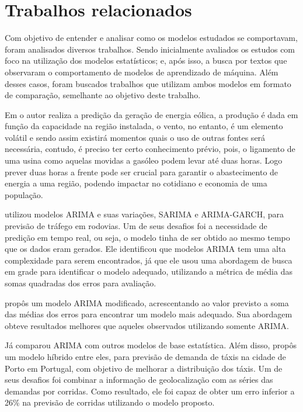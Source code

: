 \documentclass[
    12pt,
    oneside,
    a4paper,
    english,
    brazil
]{abntex2}
\begin{document}
\chapter{Trabalhos relacionados}\label{chap:trab_relacionados}

Com objetivo de  entender e analisar como os modelos  estudados se comportavam,
foram analisados  diversos trabalhos.  Sendo inicialmente avaliados  os estudos
com foco  na utilização  dos modelos  estatísticos; e, após  isso, a  busca por
textos que  observaram o  comportamento de modelos  de aprendizado  de máquina.
Além  desses casos,  foram buscados  trabalhos  que utilizam  ambos modelos  em
formato de comparação, semelhante ao objetivo deste trabalho.


Em    o autor  realiza  a  predição da  geração  de
energia eólica, a produção é dada  em função da capacidade na região instalada,
o vento,  no entanto,  é um  elemento volátil e  sendo assim  existirá momentos
quais o  uso de  outras fontes  será necessária, contudo,  é preciso  ter certo
conhecimento prévio,  pois, o  ligamento de  uma usina  como aquelas  movidas a
gasóleo podem levar  até duas horas. Logo  prever duas horas a  frente pode ser
crucial para garantir o abastecimento de energia a uma região, podendo impactar
no cotidiano e economia de uma população.

  utilizou   modelos  ARIMA   e  suas  variações,   SARIMA  e
ARIMA-GARCH, para  previsão de tráfego em  rodovias. Um de seus  desafios foi a
necessidade de predição em tempo real, ou seja, o modelo tinha de ser obtido ao
mesmo tempo  que os dados eram  gerados. Ele identificou que  modelos ARIMA tem
uma alta complexidade para serem encontrados,  já que ele usou uma abordagem de
busca em  grade para  identificar o  modelo adequado,  utilizando a  métrica de
média das somas quadradas dos erros para avaliação.

  propôs um  modelo  ARIMA modificado, acrescentando ao  valor
previsto a  soma das médias dos  erros para encontrar um  modelo mais adequado.
Sua  abordagem obteve  resultados  melhores que  aqueles observados  utilizando
somente ARIMA\@.

Já  comparou  ARIMA com outros modelos  de base estatística.
Além disso,  propôs um modelo híbrido  entre eles, para previsão  de demanda de
táxis na cidade  de Porto em Portugal, com objetivo  de melhorar a distribuição
dos táxis. Um de seus desafios  foi combinar a informação de geolocalização com
as séries das demandas por corridas. Como  resultado, ele foi capaz de obter um
erro inferior a 26\% na previsão de corridas utilizando o modelo proposto.
\end{document}

